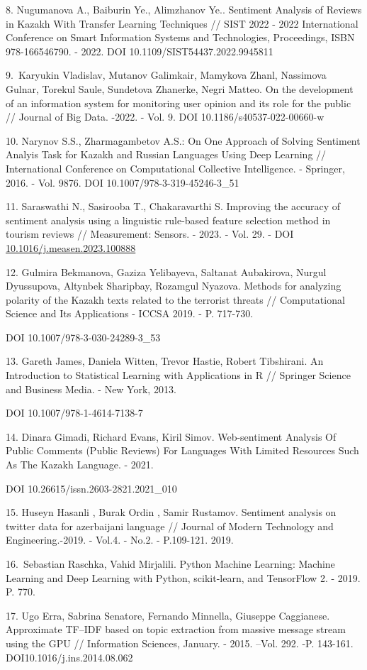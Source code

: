 \begin{references}
8. Nugumanova A., Baiburin Ye., Alimzhanov Ye.. Sentiment Analysis of
Reviews in Kazakh With Transfer Learning Techniques // SIST 2022 - 2022
International Conference on Smart Information Systems and Technologies,
Proceedings, ISBN 978-166546790. - 2022.
DOI 10.1109/SIST54437.2022.9945811

9.~Karyukin Vladislav, Mutanov Galimkair, Mamykova Zhanl, Nassimova
Gulnar, Torekul Saule, Sundetova Zhanerke, Negri Matteo. On the
development of an information system for monitoring user opinion and its
role for the public // Journal of Big Data. -2022. - Vol. 9.
DOI 10.1186/s40537-022-00660-w

10. Narynov S.S., Zharmagambetov A.S.: On One Approach of Solving
Sentiment Analyis Task for Kazakh and Russian Languages Using Deep
Learning // International Conference on Computational Collective
Intelligence. - Springer, 2016. - Vol. 9876.
DOI 10.1007/978-3-319-45246-3\_51

11. Saraswathi N., Sasirooba T., Chakaravarthi S. Improving the accuracy
of sentiment analysis using a linguistic rule-based feature selection
method in tourism reviews // Measurement: Sensors. - 2023. - Vol. 29. -
DOI
\href{https://doi.org/10.1016/j.measen.2023.100888}{10.1016/j.measen.2023.100888}

12. Gulmira Bekmanova, Gaziza Yelibayeva, Saltanat Aubakirova, Nurgul
Dyussupova, Altynbek Sharipbay, Rozamgul Nyazova. Methods for analyzing
polarity of the Kazakh texts related to the terrorist threats //
Computational Science and Its Applications - ICCSA 2019. - P. 717-730.

DOI 10.1007/978-3-030-24289-3\_53

13. Gareth James, Daniela Witten, Trevor Hastie, Robert Tibshirani. An
Introduction to Statistical Learning with Applications in R // Springer
Science and Business Media. - New York, 2013.

DOI 10.1007/978-1-4614-7138-7

14. Dinara Gimadi, Richard Evans, Kiril Simov. Web-sentiment Analysis Of
Public Comments (Public Reviews) For Languages With Limited Resources
Such As The Kazakh Language. - 2021. 

DOI  10.26615/issn.2603-2821.2021\_010

15. Huseyn Hasanli , Burak Ordin , Samir Rustamov. Sentiment analysis on
twitter data for azerbaijani language // Journal of Modern Technology
and Engineering.-2019. - Vol.4. - No.2.
- P.109-121. 2019.

16.~Sebastian Raschka, Vahid Mirjalili. Python Machine Learning: Machine
Learning and Deep Learning with Python, scikit-learn, and TensorFlow 2.
- 2019. P. 770.

17. Ugo Erra, Sabrina Senatore, Fernando Minnella, Giuseppe Caggianese.
Approximate TF--IDF based on topic extraction from massive message
stream using the GPU // Information Sciences, January. - 2015. --Vol.
292. -P. 143-161. DOI10.1016/j.ins.2014.08.062
\end{references}

